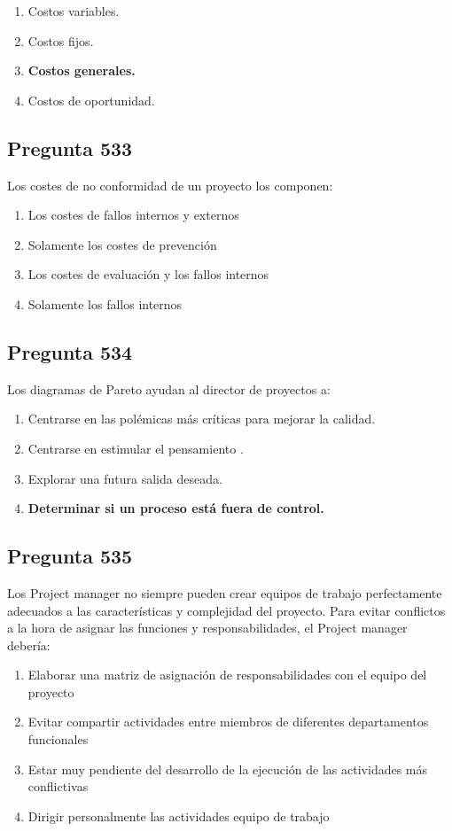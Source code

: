 \documentclass[11pt,a4paper]{article}
\begin{document}
\begin{enumerate}[label=\alph*)]
  \item Costos variables.
  \item Costos fijos.
  \item \textbf{Costos generales.}
  \item Costos de oportunidad.
\end{enumerate}

\subsection*{Pregunta 533}
Los costes de no conformidad de un proyecto los componen:

\begin{enumerate}[label=\alph*)]
  \item Los costes de fallos internos y externos
  \item Solamente los costes de prevención
  \item Los costes de evaluación y los fallos internos
  \item Solamente los fallos internos
\end{enumerate}

\subsection*{Pregunta 534}
Los diagramas de Pareto ayudan al director de proyectos a:

\begin{enumerate}[label=\alph*)]
  \item Centrarse en las polémicas más críticas para mejorar la calidad.
  \item Centrarse en estimular el pensamiento .
  \item Explorar una futura salida deseada.
  \item \textbf{Determinar si un proceso está fuera de control.}
\end{enumerate}

\subsection*{Pregunta 535}
Los Project manager no siempre pueden crear equipos de trabajo perfectamente adecuados a las características y complejidad del proyecto. Para evitar conflictos a la hora de asignar las funciones y responsabilidades, el Project manager debería:

\begin{enumerate}[label=\alph*)]
  \item Elaborar una matriz de asignación de responsabilidades con el equipo del proyecto
  \item Evitar compartir actividades entre miembros de diferentes departamentos funcionales
  \item Estar muy pendiente del desarrollo de la ejecución de las actividades más conflictivas
  \item Dirigir personalmente las actividades equipo de trabajo
\end{enumerate}
\end{document}
